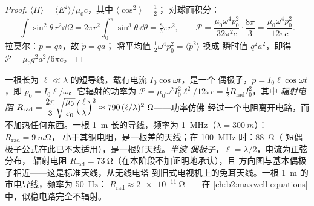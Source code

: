 \begin{proof}
$\langle\Pi\rangle = \langle E^2\rangle/\mu_0c$，其中 $\langle\cos^2\rangle = \tfrac12$；
对球面积分：
\[
\int\sin^2\theta\,r^2\dd\Omega = 2\pi r^2\int_0^\pi\sin^3\theta\,\dd\theta = \tfrac83\pi r^2 ,
\qquad
\mathcal P = \frac{\mu_0\omega^4p_0^2}{32\pi^2c}\cdot\frac{8\pi}3 = \frac{\mu_0\omega^4p_0^2}{12\pi c} .
\]
拉莫尔：$p = qz$，故 $\ddot p = qa$；
将平均值 $\tfrac12\omega^4p_0^2 = \langle\ddot p^2\rangle$ 换成
瞬时值 $q^2a^2$，即得 $\mathcal P = \mu_0q^2a^2/6\pi c$。
\end{proof}

\begin{example}[天线与导线]\label{ex:b2:dipole-radiation:antenna}
一根长为 $\ell \ll \lambda$ 的短导线，载有电流 $I_0\cos\omega t$，是一个
偶极子，$\dot p = I_0\ell\cos\omega t$，即 $p_0 = I_0\ell/\omega$。它辐射的功率为
$\mathcal P = \mu_0\omega^2I_0^2\ell^2/12\pi c = \tfrac12R_{\text{rad}}I_0^2$，其中
\emph{辐射电阻} $R_{\text{rad}} = \dfrac{2\pi}3\sqrt{\dfrac{\mu_0}{\varepsilon_0}}
\Bigl(\dfrac\ell\lambda\Bigr)^2 \approx 790\,(\ell/\lambda)^2\ \Omega$——功率仿佛
经过一个电阻离开电路，而不加热任何东西。一根 \qty{1}{m}
长的导线，频率为 \qty{1}{MHz}（$\lambda = \qty{300}{m}$）：$R_{\text{rad}} = \qty{9}{m\ohm}$，
小于其铜电阻，是一根差的天线；在 \qty{100}{MHz} 时：\qty{88}{\ohm}（
短偶极子公式在此已不太适用），是一根好天线。\emph{半波
偶极子}，$\ell = \lambda/2$，电流为正弦分布，
辐射电阻 $R_{\text{rad}} = \qty{73}{\ohm}$（在本阶段不加证明地承认），且
方向图与基本偶极子相近——这是标准天线，从无线电塔
到旧式电视机上的兔耳天线。一根 \qty{1}{m} 的市电导线，频率为 \qty{50}{Hz}：
$R_{\text{rad}} \approx \qty{2e-11}{\ohm}$——在
\cref{ch:b2:maxwell-equations}中，似稳电路完全不辐射。
\end{example}

